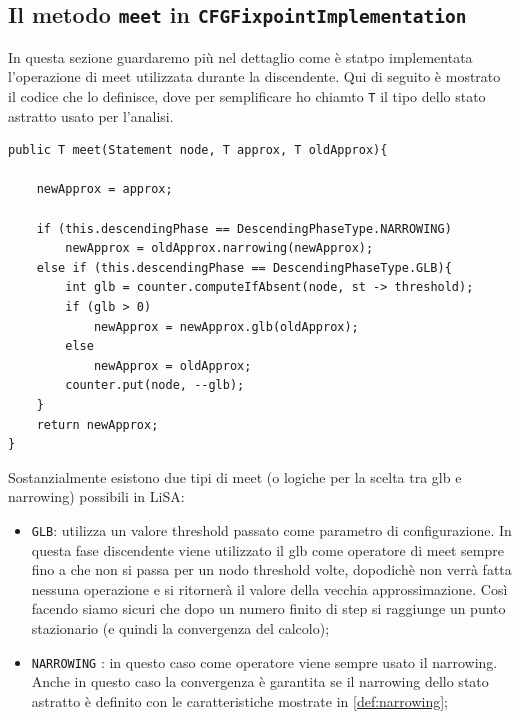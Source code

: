 \subsection{Il metodo \texttt{meet} in \texttt{CFGFixpointImplementation}}
In questa sezione guardaremo più nel dettaglio come è statpo implementata l'operazione di meet utilizzata durante la discendente. Qui di seguito è mostrato il codice che lo definisce, dove per semplificare ho chiamto \texttt{T} il tipo dello stato astratto usato per l'analisi.  
\begin{lstlisting}[belowskip=-1.1 \baselineskip, escapechar=|]
public T meet(Statement node, T approx, T oldApprox){

    newApprox = approx;
    
    if (this.descendingPhase == DescendingPhaseType.NARROWING)
        newApprox = oldApprox.narrowing(newApprox);
    else if (this.descendingPhase == DescendingPhaseType.GLB){
        int glb = counter.computeIfAbsent(node, st -> threshold);
        if (glb > 0) 
            newApprox = newApprox.glb(oldApprox);
        else
            newApprox = oldApprox;
        counter.put(node, --glb);
    }
    return newApprox;
}
\end{lstlisting}
Sostanzialmente esistono due tipi di meet (o logiche per la scelta tra glb e narrowing) possibili in LiSA:
\begin{itemize}
\itemsep0pt
    \item \texttt{GLB}: utilizza un valore threshold passato come parametro di configurazione. In questa fase discendente viene utilizzato il glb come operatore di meet sempre fino a che non si passa per un nodo threshold volte, dopodichè non verrà fatta nessuna operazione e si ritornerà il valore della vecchia approssimazione. Così facendo siamo sicuri che dopo un numero finito di step si raggiunge un punto stazionario (e quindi la convergenza del calcolo);
    \item \texttt{NARROWING} : in questo caso come operatore viene sempre usato il narrowing. Anche in questo caso la convergenza è garantita se il narrowing dello stato astratto è definito con le caratteristiche mostrate in \ref{def:narrowing};
\end{itemize}

